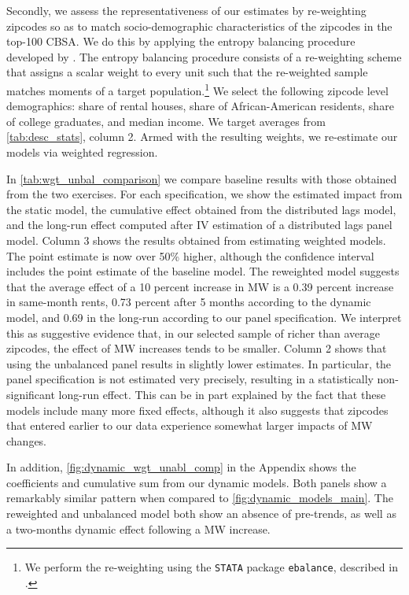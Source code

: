 Secondly, we assess the representativeness of our estimates by re-weighting zipcodes so as to match 
socio-demographic characteristics of the zipcodes in the top-100 CBSA. We do this by applying the 
entropy balancing procedure developed by \cite{hainmueller2012entropy}. 
The entropy balancing procedure consists of a re-weighting scheme that assigns a scalar 
weight to every unit such that the re-weighted sample matches moments of a target population.\footnote{We 
	perform the re-weighting using the \texttt{STATA} package \texttt{ebalance}, described in 
	\textcite{hainmueller2013ebalance}.} We select the following zipcode 
level demographics: share of rental houses, share of African-American residents, share of college 
graduates, and median income. We target averages from \autoref{tab:desc_stats}, column 
2. Armed with the resulting weights, we re-estimate our models via weighted regression.

In \autoref{tab:wgt_unbal_comparison} we compare baseline results with those obtained from the 
two exercises. For each specification, we show the estimated impact from the static model, the 
cumulative effect obtained from the distributed lags model, and the long-run effect computed after
IV estimation of a distributed lags panel model. Column 3 shows the results obtained from 
estimating weighted models. The point estimate is now over 50\% higher, although the confidence 
interval includes the point estimate of the baseline model. The reweighted model suggests that the 
average effect of a 10 percent increase in MW is a 0.39 percent increase in same-month rents, 0.73 
percent after 5 months according to the dynamic model, and 0.69 in the long-run according to our 
panel specification. We interpret this as suggestive evidence that, in our selected sample of 
richer than average zipcodes, the effect of MW increases tends to be smaller. Column 2 shows that 
using the unbalanced panel results in slightly lower estimates. In particular, the panel 
specification is not estimated very precisely, resulting in a statistically non-significant 
long-run effect. This can be in part explained by the fact that these models include many more 
fixed effects, although it also suggests that zipcodes that entered earlier to our data experience 
somewhat larger impacts of MW changes.

In addition, \autoref{fig:dynamic_wgt_unabl_comp} in the Appendix shows the coefficients and 
cumulative sum from our dynamic models. Both panels show a remarkably similar pattern when compared 
to \autoref{fig:dynamic_models_main}. The reweighted and unbalanced model both show an absence of 
pre-trends, as well as a two-months dynamic effect following a MW increase.


